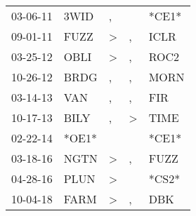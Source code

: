 \begin{supertabular}{lllll}
 03-06-11 &   3WID &             , &               &  *CE1* \\
 09-01-11 &   FUZZ &  \textgreater &             , &   ICLR \\
 03-25-12 &   OBLI &  \textgreater &             , &   ROC2 \\
 10-26-12 &   BRDG &             , &             , &   MORN \\
 03-14-13 &    VAN &             , &             , &    FIR \\
 10-17-13 &   BILY &             , &  \textgreater &   TIME \\
 02-22-14 &  *OE1* &               &               &  *CE1* \\
 03-18-16 &   NGTN &  \textgreater &             , &   FUZZ \\
 04-28-16 &   PLUN &  \textgreater &               &  *CS2* \\
 10-04-18 &   FARM &  \textgreater &             , &    DBK \\
\end{supertabular}
